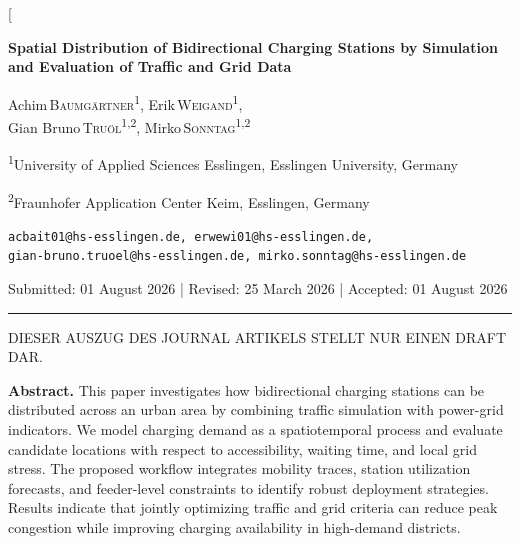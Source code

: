 \twocolumn[
    {\centering
        {\LARGE\bfseries Spatial Distribution of Bidirectional Charging Stations by Simulation and Evaluation of Traffic and Grid Data\par}
        \vspace{1.2em}

        {\large
        Achim\,\textsc{Baumgärtner}\textsuperscript{1},\quad
        Erik\,\textsc{Weigand}\textsuperscript{1},\quad \\
        Gian Bruno\,\textsc{Truöl}\textsuperscript{1,2},\quad
        Mirko\,\textsc{Sonntag}\textsuperscript{1,2}\par
        }
        \vspace{0.6em}

        {\small
        \textsuperscript{1}University of Applied Sciences Esslingen,
            Esslingen University, Germany\par
        \textsuperscript{2}Fraunhofer Application Center Keim,
            Esslingen, Germany\par
        }
        \vspace{0.4em}

        {\small\texttt{acbait01@hs-esslingen.de, erwewi01@hs-esslingen.de, \\ gian-bruno.truoel@hs-esslingen.de, mirko.sonntag@hs-esslingen.de}\par}
        \vspace{0.8em}

        {\small Submitted: 01 August 2026 \quad|\quad
            Revised: 25 March 2026 \quad|\quad
            Accepted: 01 August 2026\par}
    }

    \vspace{0.8em}\hrule\vspace{0.8em}

    DIESER AUSZUG DES JOURNAL ARTIKELS STELLT NUR EINEN DRAFT DAR.


    {\noindent\textbf{Abstract.} This paper investigates how bidirectional charging stations can be distributed across an urban area by combining traffic simulation with power-grid indicators. We model charging demand as a spatiotemporal process and evaluate candidate locations with respect to accessibility, waiting time, and local grid stress. The proposed workflow integrates mobility traces, station utilization forecasts, and feeder-level constraints to identify robust deployment strategies. Results indicate that jointly optimizing traffic and grid criteria can reduce peak congestion while improving charging availability in high-demand districts.\par}


